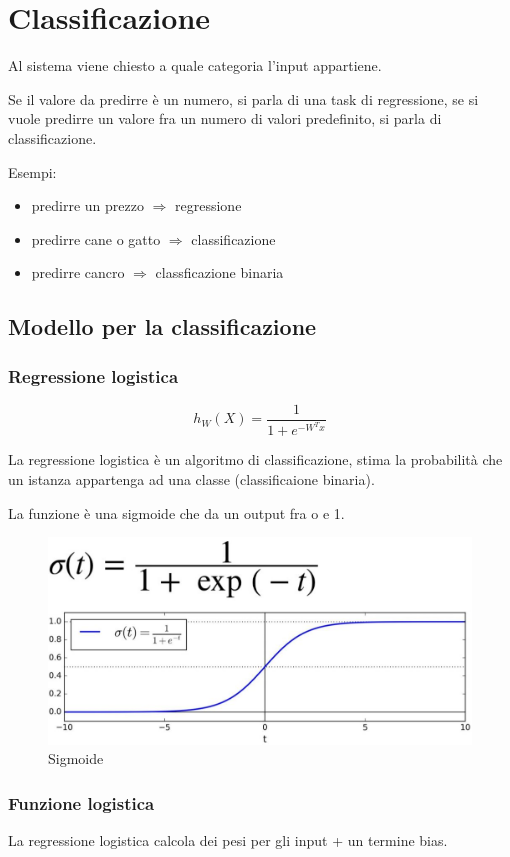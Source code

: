 \section{Classificazione}
Al sistema viene chiesto a quale categoria l'input appartiene.

Se il valore da predirre è un numero, si parla di una task di regressione,
se si vuole predirre un valore fra un numero di valori predefinito, si parla di
classificazione.

Esempi:
\begin{itemize}
    \item predirre un prezzo $\Rightarrow$ regressione
    \item predirre cane o gatto $\Rightarrow$ classificazione
    \item predirre cancro $\Rightarrow$ classficazione binaria
\end{itemize}


\subsection{Modello per la classificazione}
\subsubsection{Regressione logistica}
\begin{equation}
    h_W(X) = \frac{1}{1+e^{-W^{T}x}}
\end{equation}



La regressione logistica è un algoritmo di classificazione, stima la probabilità
che un istanza appartenga ad una classe (classificaione binaria).

La funzione è una sigmoide che da un output fra o e 1.

\begin{figure}[H]
    \centering
    \includegraphics[width=0.4\linewidth]{imgs/sigmoide}
    \caption{Sigmoide}
    \label{fig:sigmoide}
\end{figure}

\subsubsection{Funzione logistica}
La regressione logistica calcola dei pesi per gli input + un termine bias.

